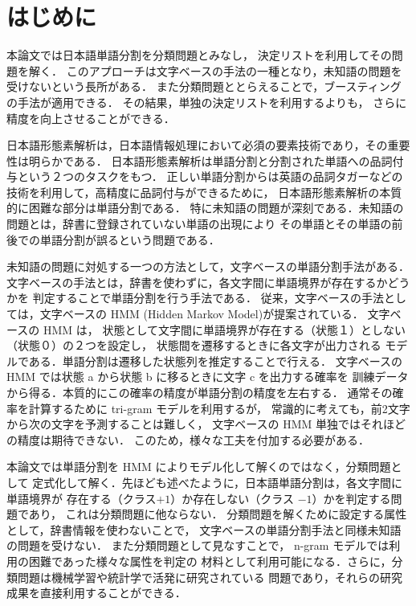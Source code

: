 

\maketitle





\section{はじめに}


本論文では日本語単語分割を分類問題とみなし，
決定リストを利用してその問題を解く．
このアプローチは文字ベースの手法の一種となり，未知語の問題を受けないという長所がある．
また分類問題ととらえることで，ブースティングの手法が適用できる．
その結果，単独の決定リストを利用するよりも，
さらに精度を向上させることができる．

日本語形態素解析は，日本語情報処理において必須の要素技術であり，その重要性は明らかである．
日本語形態素解析は単語分割と分割された単語への品詞付与という２つのタスクをもつ．
正しい単語分割からは英語の品詞タガーなどの技術を利用して，高精度に品詞付与ができるために，
日本語形態素解析の本質的に困難な部分は単語分割である．
特に未知語の問題が深刻である．未知語の問題とは，辞書に登録されていない単語の出現により
その単語とその単語の前後での単語分割が誤るという問題である．

未知語の問題に対処する一つの方法として，文字ベースの単語分割手法がある．
文字ベースの手法とは，辞書を使わずに，各文字間に単語境界が存在するかどうかを
判定することで単語分割を行う手法である．
従来，文字ベースの手法としては，文字ベースの HMM (Hidden Markov Model)が提案されている．
文字ベースの HMM は，
状態として文字間に単語境界が存在する（状態１）としない（状態０）の２つを設定し，
状態間を遷移するときに各文字が出力される
モデルである．単語分割は遷移した状態列を推定することで行える．
文字ベースの HMM では状態 a から状態 b に移るときに文字 c を出力する確率を
訓練データから得る．本質的にこの確率の精度が単語分割の精度を左右する．
通常その確率を計算するために tri-gram モデルを利用するが，
常識的に考えても，前2文字から次の文字を予測することは難しく，
文字ベースの HMM 単独ではそれほどの精度は期待できない．
このため，様々な工夫を付加する必要がある\cite{yamamoto97,tsuji97,oda98}．

本論文では単語分割を HMM によりモデル化して解くのではなく，分類問題として
定式化して解く．先ほども述べたように，日本語単語分割は，各文字間に単語境界が
存在する（クラス\( +1 \)）か存在しない（クラス \( -1 \)）かを判定する問題であり，
これは分類問題に他ならない．
分類問題を解くために設定する属性として，辞書情報を使わないことで，
文字ベースの単語分割手法と同様未知語の問題を受けない．
また分類問題として見なすことで， n-gram モデルでは利用の困難であった様々な属性を判定の
材料として利用可能になる．さらに，分類問題は機械学習や統計学で活発に研究されている
問題であり，それらの研究成果を直接利用することができる．

